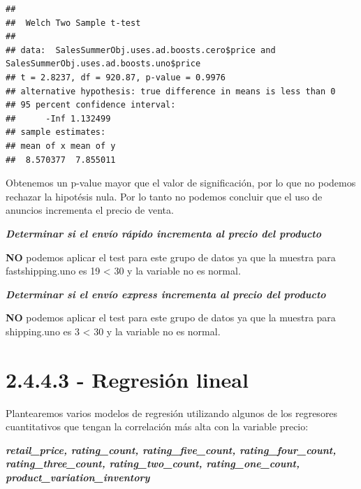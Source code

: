 \documentclass[
]{article}
\newenvironment{Shaded}{\begin{snugshade}}{\end{snugshade}}
\newcommand{\CommentTok}[1]{\textcolor[rgb]{0.56,0.35,0.01}{\textit{#1}}}
\newcommand{\NormalTok}[1]{#1}
\newcommand{\OperatorTok}[1]{\textcolor[rgb]{0.81,0.36,0.00}{\textbf{#1}}}
\newcommand{\StringTok}[1]{\textcolor[rgb]{0.31,0.60,0.02}{#1}}
\begin{document}
\begin{verbatim}
## 
##  Welch Two Sample t-test
## 
## data:  SalesSummerObj.uses.ad.boosts.cero$price and SalesSummerObj.uses.ad.boosts.uno$price
## t = 2.8237, df = 920.87, p-value = 0.9976
## alternative hypothesis: true difference in means is less than 0
## 95 percent confidence interval:
##      -Inf 1.132499
## sample estimates:
## mean of x mean of y 
##  8.570377  7.855011
\end{verbatim}

Obtenemos un p-value mayor que el valor de significación, por lo que no
podemos rechazar la hipotésis nula. Por lo tanto no podemos concluir que
el uso de anuncios incrementa el precio de venta.

\textbf{\emph{Determinar si el envío rápido incrementa al precio del
producto}}

\textbf{NO} podemos aplicar el test para este grupo de datos ya que la
muestra para fastshipping.uno es 19 \textless{} 30 y la variable no es
normal.

\textbf{\emph{Determinar si el envío express incrementa al precio del
producto}}

\textbf{NO} podemos aplicar el test para este grupo de datos ya que la
muestra para shipping.uno es 3 \textless{} 30 y la variable no es
normal.

\hypertarget{regresiuxf3n-lineal}{%
\section{2.4.4.3 - Regresión lineal}\label{regresiuxf3n-lineal}}

Plantearemos varios modelos de regresión utilizando algunos de los
regresores cuantitativos que tengan la correlación más alta con la
variable precio:

\textbf{\emph{retail\_price, rating\_count, rating\_five\_count,
rating\_four\_count, rating\_three\_count, rating\_two\_count,
rating\_one\_count, product\_variation\_inventory}}

\begin{Shaded}
\end{Shaded}
\end{document}
